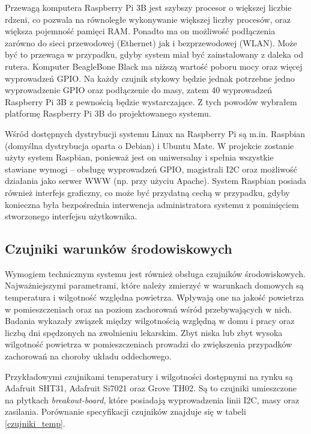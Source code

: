 \documentclass[a4paper,11pt,twoside]{article}
\begin{document}
Przewagą komputera Raspberry Pi 3B jest szybszy procesor o większej liczbie rdzeni, co pozwala na równoległe wykonywanie większej liczby procesów, oraz większa pojemność pamięci RAM. Ponadto ma on możliwość podłączenia zarówno do sieci przewodowej (Ethernet) jak i bezprzewodowej (WLAN). Może być to przewaga w przypadku, gdyby system miał być zainstalowany z daleka od rutera. Komputer BeagleBone Black ma niższą wartość poboru mocy oraz więcej wyprowadzeń GPIO. Na każdy czujnik stykowy będzie jednak potrzebne jedno wyprowadzenie GPIO oraz podłączenie do masy, zatem 40 wyprowadzeń Raspberry Pi 3B z pewnością będzie wystarczające. Z tych powodów wybrałem platformę Raspberry Pi 3B do projektowanego systemu.

Wśród dostępnych dystrybucji systemu Linux na Raspberry Pi są m.in. Raspbian (domyślna dystrybucja oparta o Debian) i Ubuntu Mate. W projekcie zostanie użyty system Raspbian, ponieważ jest on uniwersalny i spełnia wszystkie stawiane wymogi -- obsługę wyprowadzeń GPIO, magistrali I2C oraz możliwość działania jako serwer WWW (np. przy użyciu Apache). System Raspbian posiada również interfejs graficzny, co może być przydatną cechą w przypadku, gdyby konieczna była bezpośrednia interwencja administratora systemu z pominięciem stworzonego interfejsu użytkownika.

\subsection{Czujniki warunków środowiskowych}
Wymogiem technicznym systemu jest również obsługa czujników środowiskowych. Najważniejszymi parametrami, które należy zmierzyć w warunkach domowych są temperatura i wilgotność względna powietrza. Wpływają one na jakość powietrza w pomieszczeniach oraz na poziom zachorowań wśród przebywających w nich. Badania wykazały związek między wilgotnością względną w domu i pracy oraz liczbą dni spędzonych na zwolnieniu lekarskim. Zbyt niska lub zbyt wysoka wilgotność powietrza w pomieszczeniach prowadzi do zwiększenia przypadków zachorowań na choroby układu oddechowego. \cite{zachorowania} 

Przykładowymi czujnikami temperatury i wilgotności dostępnymi na rynku są Adafruit SHT31, Adafruit Si7021 oraz Grove TH02. Są to czujniki umieszczone na płytkach \textit{breakout-board}, które posiadają wyprowadzenia linii I2C, masy oraz zasilania. Porównanie specyfikacji czujników znajduje się w tabeli \ref{czujniki_temp}.
\end{document}
